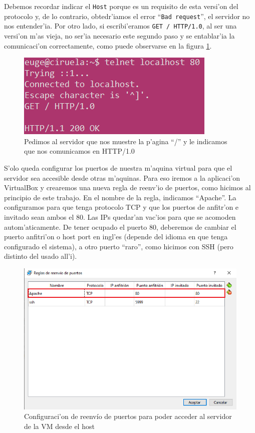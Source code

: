 \documentclass[11pt]{article}
\begin{document}
		Debemos recordar indicar el \texttt{Host} porque es un requisito de esta versi'on del protocolo y, de lo contrario, obtedr'iamos el error ``\texttt{Bad request}'', el servidor no nos entender'ia. Por otro lado, si escribi'eramos \texttt{GET / HTTP/1.0}, al ser una versi'on m'as vieja, no ser'ia necesario este segundo paso y se entablar'ia la comunicaci'on correctamente, como puede observarse en la figura \ref{fig:5}.

		\begin{figure}[H]
    			\centering \captionsetup{justification=centering}
    			\includegraphics[scale=0.6]{Images/Apache/fig5_.png}
    			\caption{Pedimos al servidor que nos muestre la p'agina ``/'' y le indicamos que nos comunicamos en HTTP/1.0}
    			\label{fig:5}
		\end{figure}

		S'olo queda configurar los puertos de nuestra m'aquina virtual para que el servidor sea accesible desde otras m'aquinas. Para eso iremos a la aplicaci'on VirtualBox y crearemos una nueva regla de reenv'io de puertos, como hicimos al principio de este trabajo. En el nombre de la regla, indicamos ``Apache''. La configuramos para que tenga protocolo TCP y que los puertos de anfitr'on e invitado sean ambos el 80. Las IPs quedar'an vac'ios para que se acomoden autom'aticamente. De tener ocupado el puerto 80, deberemos de cambiar el puerto anfitri'on o host port en ingl'es (depende del idioma en que tenga configurado el sistema), a otro puerto ``raro'', como hicimos con SSH (pero distinto del usado all'i).

		\begin{figure}[H]
    			\centering \captionsetup{justification=centering}
    			\includegraphics[scale=0.65]{Images/Apache/fig6.png}
   			\caption{Configuraci'on de reenvío de puertos para poder acceder al servidor de la VM desde el host}
    			\label{fig:6}
		\end{figure}
\end{document}
